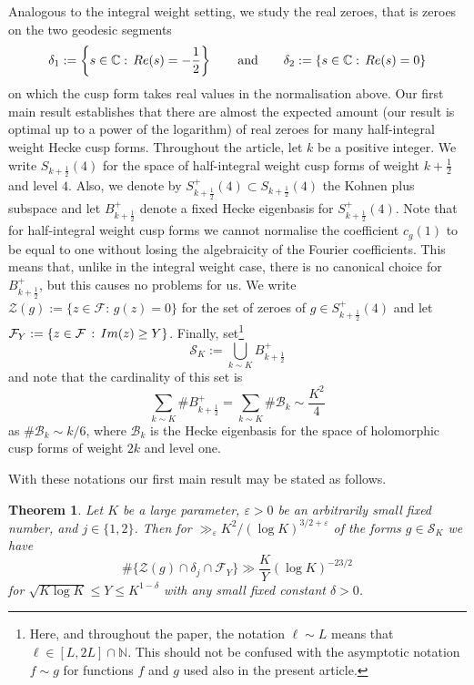 \documentclass[a4paper,10pt,twoside]{amsart}
\newtheorem{theorem}{Theorem}[section]
\theoremstyle{definition}
\numberwithin{equation}{section}
\renewcommand{\Re}{\textnormal{Re}}
\renewcommand{\Im}{\textnormal{Im}}
\renewcommand\:{\colon}
\begin{document}
Analogous to the integral weight setting, we study the real zeroes, that is zeroes on the two geodesic segments
\[ 
\delta_1:=\left\{s\in\mathbb C:\,\Re(s)=-\frac12\right\} \qquad \text{and} \qquad \delta_2:=\left\{s\in\mathbb C:\,\Re(s)=0\right\}
\] on which the cusp form takes real values in the normalisation above. Our first main result establishes that there are almost the expected amount (our result is optimal up to a power of the logarithm) of real zeroes for many half-integral weight Hecke cusp forms. Throughout the article, let $k$ be a positive integer. We write $S_{k+\frac12}(4)$ for the space of half-integral weight cusp forms of weight $k+\frac12$ and level $4$. Also, we denote by $S_{k+\frac12}^+(4)\subset S_{k+\frac12}(4)$ the Kohnen plus subspace and let $B^+_{k+\frac12}$ denote a fixed Hecke eigenbasis for $S_{k+\frac12}^+(4)$. Note that for half-integral weight cusp forms we cannot normalise the coefficient $c_g(1)$ to be equal to one without losing the algebraicity of the Fourier coefficients. This means that, unlike in the integral weight case, there is no canonical choice for $B_{k+\frac12}^+$, but this causes no problems for us. We write $\mathcal Z(g):=\{z\in\mathcal F:\,g(z)=0\}$ for the set of zeroes of $g\in S_{k+\frac12}^+(4)$ and let $\mathcal F_Y:=\{z\in\mathcal F\,:\,\Im(z)\geq Y\}$. Finally, set\footnote{Here, and throughout the paper, the notation $\ell\sim L$ means that $\ell\in[L,2L]\cap\mathbb N$. This should not be confused with the asymptotic notation $f\sim g$ for functions $f$ and $g$ used also in the present article.}
\[\mathcal S_K:=\bigcup_{k\sim K}B_{k+\frac12}^+\]
and note that the cardinality of this set is 
\[\sum_{k\sim K}\# B_{k+\frac12}^+=\sum_{k\sim K}\#\mathcal B_k\sim \frac{K^2}4
\]
as $\#\mathcal B_k\sim k/6$, where $\mathcal B_k$ is the Hecke eigenbasis for the space of holomorphic cusp forms of weight $2k$ and level one. 

With these notations our first main result may be stated as follows.

\begin{theorem}\label{main-theorem}
Let $K$ be a large parameter, $\varepsilon>0$ be an arbitrarily small fixed number, and $j\in\{1,2\}$. Then for $\gg_\varepsilon K^2/(\log K)^{3/2+\varepsilon}$ of the forms $g\in\mathcal S_K$ we have 
\[\#\{\mathcal Z(g)\cap\delta_j\cap\mathcal F_Y\}\gg\frac K{Y}\left(\log K\right)^{-23/2}  \]
for $\sqrt{K\log K}\leq Y\leq K^{1-\delta}$ with any small fixed constant $\delta>0$. 
\end{theorem} 
\end{document}
